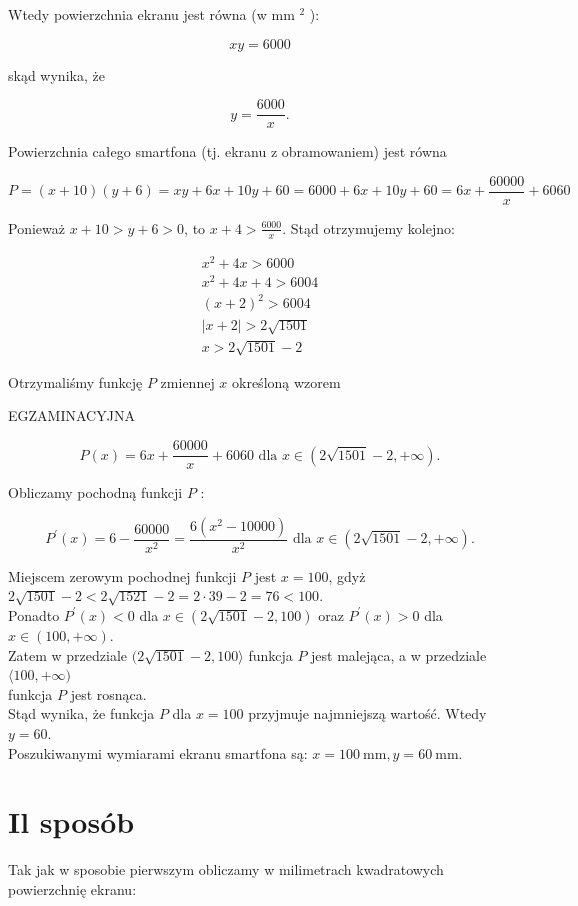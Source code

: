 \documentclass[10pt]{article}
\begin{document}
Wtedy powierzchnia ekranu jest równa (w mm ${ }^{2}$ ):

$$
x y=6000
$$

skąd wynika, że

$$
y=\frac{6000}{x} .
$$

Powierzchnia całego smartfona (tj. ekranu z obramowaniem) jest równa

$$
P=(x+10)(y+6)=x y+6 x+10 y+60=6000+6 x+10 y+60=6 x+\frac{60000}{x}+6060
$$

Ponieważ $x+10>y+6>0$, to $x+4>\frac{6000}{x}$. Stąd otrzymujemy kolejno:

$$
\begin{gathered}
x^{2}+4 x>6000 \\
x^{2}+4 x+4>6004 \\
(x+2)^{2}>6004 \\
|x+2|>2 \sqrt{1501} \\
x>2 \sqrt{1501}-2
\end{gathered}
$$

Otrzymaliśmy funkcję $P$ zmiennej $x$ określoną wzorem

EGZAMINACYJNA

$$
P(x)=6 x+\frac{60000}{x}+6060 \text { dla } x \in(2 \sqrt{1501}-2,+\infty) .
$$

Obliczamy pochodną funkcji $P$ :

$$
P^{\prime}(x)=6-\frac{60000}{x^{2}}=\frac{6\left(x^{2}-10000\right)}{x^{2}} \text { dla } x \in(2 \sqrt{1501}-2,+\infty) .
$$

Miejscem zerowym pochodnej funkcji $P$ jest $x=100$, gdyż\\
$2 \sqrt{1501}-2<2 \sqrt{1521}-2=2 \cdot 39-2=76<100$.\\
Ponadto $P^{\prime}(x)<0$ dla $x \in(2 \sqrt{1501}-2,100)$ oraz $P^{\prime}(x)>0$ dla $x \in(100,+\infty)$.\\
Zatem w przedziale $(2 \sqrt{1501}-2,100\rangle$ funkcja $P$ jest malejąca, a w przedziale $\langle 100,+\infty)$\\
funkcja $P$ jest rosnąca.\\
Stąd wynika, że funkcja $P$ dla $x=100$ przyjmuje najmniejszą wartość. Wtedy $y=60$.\\
Poszukiwanymi wymiarami ekranu smartfona są: $x=100 \mathrm{~mm}, y=60 \mathrm{~mm}$.

\section*{Il sposób}
Tak jak w sposobie pierwszym obliczamy w milimetrach kwadratowych powierzchnię ekranu:
\end{document}
